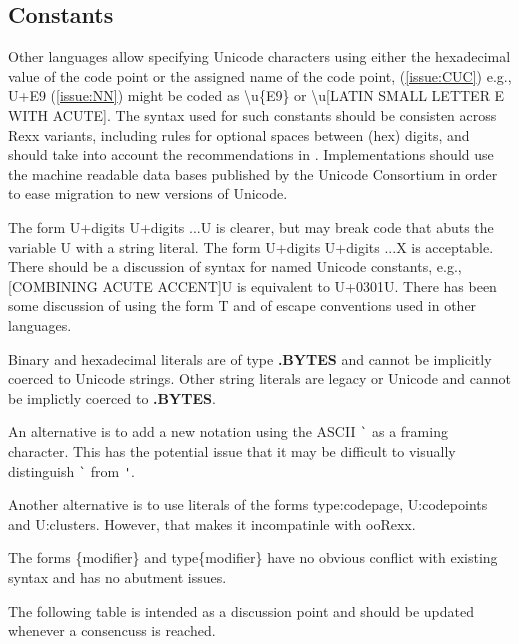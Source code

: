 \documentclass[b4paper]{article}
\begin{document}
\subsection{Constants}
Other languages allow specifying Unicode characters using either
the hexadecimal value of the code point or the assigned name of the code point,
(\cref{issue:CUC})
e.g., U+E9
(\cref{issue:NN})
might be coded as {\textbackslash}u\{E9\} or {\textbackslash}u[LATIN SMALL LETTER E WITH ACUTE].
The syntax used for such constants should be consisten across Rexx variants,
including rules for optional spaces between (hex) digits,
and should take into account the recommendations in \cite{RFC:5137}.
Implementations should use the machine readable data bases published by
the Unicode Consortium in order to ease migration to new versions of Unicode.

The form {\textquotesingle}U+digits U+digits ...{\textquotesingle}U is clearer,
but may break code that abuts the variable U with a string literal.
The form {\textquotesingle}U+digits U+digits ...{\textquotesingle}X is acceptable.
There should be a discussion of syntax for named Unicode constants, e.g.,
{\textquotesingle}[COMBINING ACUTE ACCENT]{\textquotesingle}U is
equivalent to {\textquotesingle}U+0301{\textquotesingle}U.
There has been some discussion of using the form
{\textquotesingle}\textellipsis{\textquotesingle}T and of escape conventions
used in other languages.

Binary and hexadecimal literals are of type \textbf{.BYTES} and cannot be implicitly coerced to Unicode strings.
Other string literals are legacy or Unicode and cannot be implictly coerced to \textbf{.BYTES}.

An alternative is to add a new notation using the ASCII \verb|`| as a
framing character. This has the potential issue that it may be
difficult to visually distinguish  \verb|`| from  \verb|'|.

Another alternative is to use literals of the forms
{\textquotesingle}\textellipsis{\textquotesingle}type:codepage,
{\textquotesingle}\textellipsis{\textquotesingle}U:codepoints and
{\textquotesingle}\textellipsis{\textquotesingle}U:clusters. However,
that makes it incompatinle with ooRexx.

The forms {\textquotesingle}\textellipsis{\textquotesingle}\{modifier\} and
{\textquotesingle}\textellipsis{\textquotesingle}type\{modifier\}
have no obvious conflict with existing syntax and has no abutment issues.

The following table is intended as a discussion point and should be updated whenever a consencuss is reached.
\end{document}
